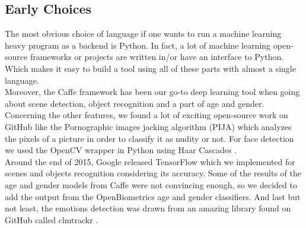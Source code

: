 \documentclass{article}
\begin{document}
    \subsection{Early Choices}
        The most obvious choice of language if one wants to run a machine learning heavy program as a backend is Python. In fact, a lot of machine learning open-source frameworks or projects are written in/or have an interface to Python. Which makes it easy to build a tool using all of these parts with almost a single language.
        \\Moreover, the Caffe framework \cite{caffe} has been our go-to deep learning tool when going about scene detection, object recognition and a part of age and gender.
        Concerning the other features, we found a lot of exciting open-source work on GitHub like the Pornographic images jacking algorithm (PIJA) \cite{pija} which analyzes the pixels of a picture in order to classify it as nudity or not. For face detection we used the OpenCV wrapper in Python using Haar Cascades \cite{haar}.
        \\Around the end of 2015, Google released TensorFlow \cite{tensor} which we implemented for scenes and objects recognition considering its accuracy.
        Some of the results of the age and gender models from Caffe were not convincing enough, so we decided to add the output from the OpenBiometrics \cite{openbr} age and gender classifiers.
        And last but not least, the emotions detection was drawn from an amazing library found on GitHub called clmtrackr \cite{clm}.
    \newpage
\end{document}

